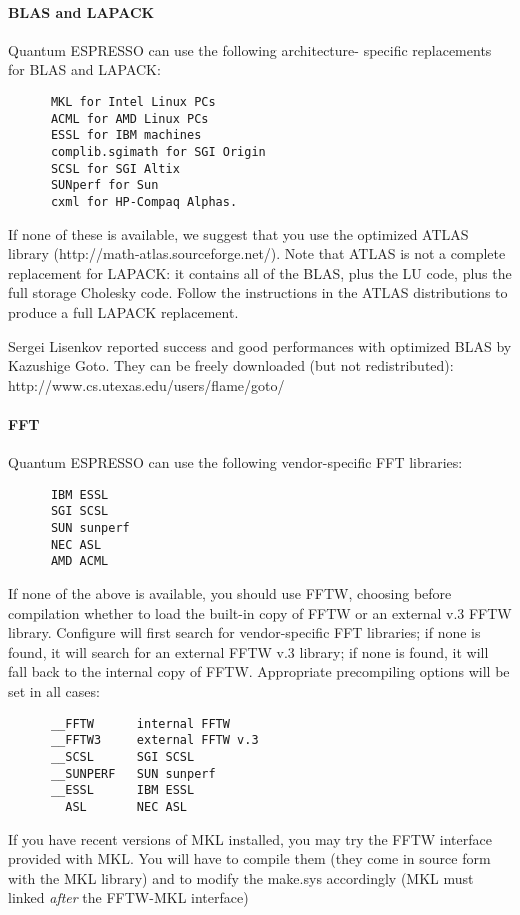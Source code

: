 \documentclass[12pt,a4paper]{article}
\begin{document}
\paragraph{BLAS and LAPACK} 
Quantum ESPRESSO can use the following architecture-
specific replacements for BLAS and LAPACK:
\begin{verbatim}
      MKL for Intel Linux PCs
      ACML for AMD Linux PCs
      ESSL for IBM machines
      complib.sgimath for SGI Origin
      SCSL for SGI Altix
      SUNperf for Sun
      cxml for HP-Compaq Alphas.
\end{verbatim}
If none of these is available, we suggest that you use the optimized ATLAS
library (http://math-atlas.sourceforge.net/). Note that ATLAS is not
a complete replacement for LAPACK: it contains all of the BLAS, plus the
LU code, plus the full storage Cholesky code. Follow the instructions in the
ATLAS distributions to produce a full LAPACK replacement.
    
Sergei Lisenkov reported success and good performances with optimized
BLAS by Kazushige Goto. They can be freely downloaded  (but not redistributed):
http://www.cs.utexas.edu/users/flame/goto/

\paragraph{FFT}
Quantum ESPRESSO can use the following vendor-specific FFT libraries:
\begin{verbatim}
      IBM ESSL
      SGI SCSL
      SUN sunperf
      NEC ASL
      AMD ACML
\end{verbatim}
If none of the above is available, you should use FFTW, choosing
before compilation whether to load the built-in copy of FFTW 
or an external v.3 FFTW library.
Configure will first search for vendor-specific FFT libraries;
if none is found, it will search for an external FFTW v.3 library;
if none is found, it will fall back to the internal  copy of FFTW.
Appropriate precompiling options will be set in all cases:
\begin{verbatim}
      __FFTW      internal FFTW
      __FFTW3     external FFTW v.3
      __SCSL      SGI SCSL
      __SUNPERF   SUN sunperf 
      __ESSL      IBM ESSL
        ASL       NEC ASL
\end{verbatim}
If you have recent versions of MKL installed, you may try the 
FFTW interface provided with MKL. You will have to compile them
(they come in source form with the MKL library)
and to modify the make.sys accordingly (MKL must linked {\em after}
the FFTW-MKL interface)
\end{document}
